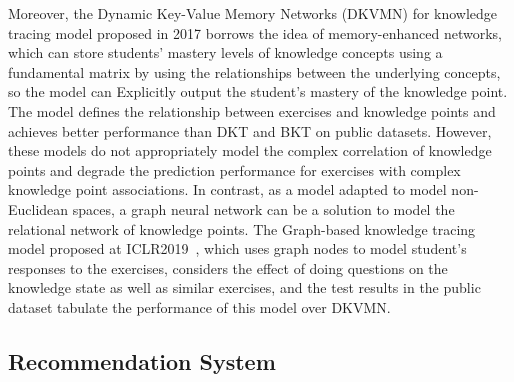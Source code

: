 Moreover, the Dynamic Key-Value Memory Networks (DKVMN) for knowledge tracing model proposed in 2017 borrows the idea of memory-enhanced networks, which can store students' mastery levels of knowledge concepts using a fundamental matrix by using the relationships between the underlying concepts, so the model can Explicitly output the student's mastery of the knowledge point. The model defines the relationship between exercises and knowledge points and achieves better performance than DKT and BKT on public datasets. However, these models do not appropriately model the complex correlation of knowledge points and degrade the prediction performance for exercises with complex knowledge point associations. In contrast, as a model adapted to model non-Euclidean spaces, a graph neural network can be a solution to model the relational network of knowledge points. The Graph-based knowledge tracing model proposed at ICLR2019~\cite{nakagawa2019graph}, which uses graph nodes to model student's responses to the exercises, considers the effect of doing questions on the knowledge state as well as similar exercises, and the test results in the public dataset tabulate the performance of this model over DKVMN.


\subsection{Recommendation System}


